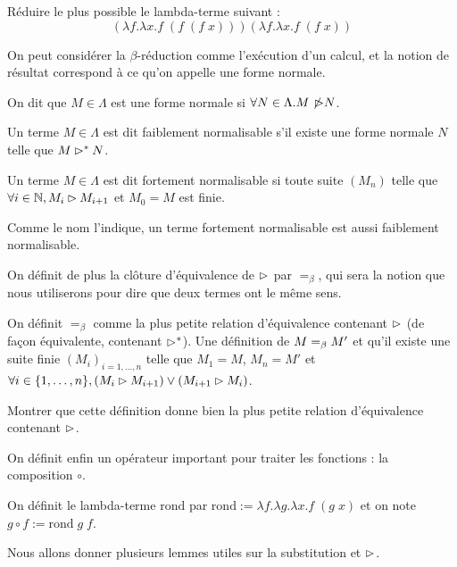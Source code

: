 \begin{exo}
    Réduire le plus possible le lambda-terme suivant : $$(\lambda f.\lambda x.f\;(f\;(f\;x)))(\lambda f.\lambda x.f\;(f\;x))$$
\end{exo}

On peut considérer la $\beta$-réduction comme l'exécution d'un calcul, et la notion de résultat correspond à ce qu'on appelle une forme normale.

\begin{defi}
    On dit que $M\in\Lambda$ est une forme normale si $\forall N\in\Lambda. M\not\!\rhd N$.

    Un terme $M\in\Lambda$ est dit faiblement normalisable s'il existe une forme normale $N$ telle que $M\rhd^* N$.

    Un terme $M\in\Lambda$ est dit fortement normalisable si toute suite $(M_n)$ telle que $\forall i\in\mathbb{N}, M_i\rhd M_{i+1}$ et $M_0 = M$ est finie.
\end{defi}

Comme le nom l'indique, un terme fortement normalisable est aussi faiblement normalisable.

On définit de plus la clôture d'équivalence de $\rhd$ par $=_\beta$, qui sera la notion que nous utiliserons pour dire que deux termes ont le même sens.

\begin{defi}
    On définit $=_\beta$ comme la plus petite relation d'équivalence contenant $\rhd$ (de façon équivalente, contenant $\rhd^*$). Une définition de $M=_\beta M'$ et qu'il existe une suite finie $(M_i)_{i=1,\ldots,n}$ telle que $M_1 = M$, $M_n = M'$ et $\forall i \in\{1,\ldots,n\}, (M_i\rhd M_{i+1})\lor (M_{i+1}\rhd M_i)$.
\end{defi}

\begin{exo}
    Montrer que cette définition donne bien la plus petite relation d'équivalence contenant $\rhd$.
\end{exo}

On définit enfin un opérateur important pour traiter les fonctions : la composition $\circ$.

\begin{defi}
    On définit le lambda-terme $\mathrm{rond}$ par $\mathrm{rond} := \lambda f.\lambda g.\lambda x.f\;(g\;x)$ et on note $g\circ f := \mathrm{rond}\;g\;f$.
\end{defi}

Nous allons donner plusieurs lemmes utiles sur la substitution et $\rhd$.

